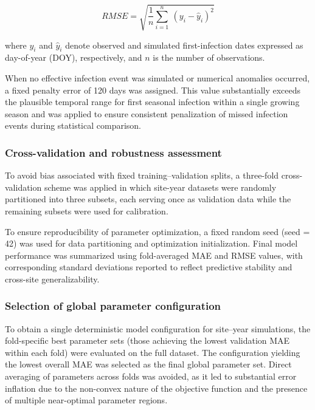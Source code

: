 \documentclass[
]{article}
\begin{document}
\begin{equation}
RMSE = \sqrt{\frac{1}{n}\sum_{i = 1}^{n}\mspace{2mu}\mspace{2mu}{\left( y_{i} - {\widehat{y}}_{i} \right)}^{2}}
\tag{13}
\end{equation}

where \(y_{i}\) and \({\widehat{y}}_{i}\) denote observed and simulated
first-infection dates expressed as day-of-year (DOY), respectively, and
\(n\) is the number of observations.

When no effective infection event was simulated or numerical anomalies
occurred, a fixed penalty error of 120 days was assigned. This value
substantially exceeds the plausible temporal range for first seasonal
infection within a single growing season and was applied to ensure
consistent penalization of missed infection events during statistical
comparison.

\subsubsection{Cross-validation and robustness
assessment}\label{cross-validation-and-robustness-assessment}

To avoid bias associated with fixed training--validation splits, a
three-fold cross-validation scheme was applied in which site-year
datasets were randomly partitioned into three subsets, each serving once
as validation data while the remaining subsets were used for
calibration.

To ensure reproducibility of parameter optimization, a fixed random seed
(seed = 42) was used for data partitioning and optimization
initialization. Final model performance was summarized using
fold-averaged MAE and RMSE values, with corresponding standard
deviations reported to reflect predictive stability and cross-site
generalizability.

\subsubsection{Selection of global parameter
configuration}\label{selection-of-global-parameter-configuration}

To obtain a single deterministic model configuration for site--year
simulations, the fold-specific best parameter sets (those achieving the
lowest validation MAE within each fold) were evaluated on the full
dataset. The configuration yielding the lowest overall MAE was selected
as the final global parameter set. Direct averaging of parameters across
folds was avoided, as it led to substantial error inflation due to the
non-convex nature of the objective function and the presence of multiple
near-optimal parameter regions.
\end{document}

